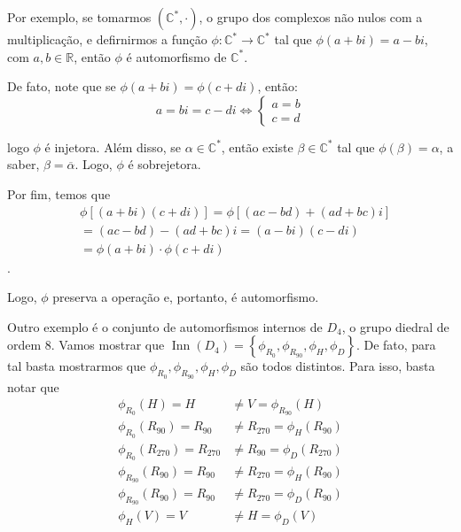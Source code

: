 \documentclass[a4paper,portuguese,11pt,twoside, leqno]{book}
\DeclareMathOperator{\inn}{Inn}
\theoremstyle{definition}
\begin{document}
	\par\vspace{0.3cm} Por exemplo, se tomarmos $(\mathbb{C^{*}}, \cdot)$, o grupo dos complexos não nulos com a multiplicação, e defirnirmos a função $\phi : \mathbb{C^{*}}\to\mathbb{C^{*}}$ tal que $\phi(a+bi) = a-bi$, com $a,b\in\mathbb{R}$, então $\phi$ é automorfismo de $\mathbb{C^{*}}$. 
	\par\vspace{0.3cm} De fato, note que se $\phi(a+bi) = \phi(c+di)$, então:
	\begin{equation*}
	a = bi = c - di \Leftrightarrow \begin{cases}a = b \\ c = d\end{cases}
	\end{equation*}
	\par\vspace{0.3cm} logo $\phi$ é injetora.  Além disso, se $\alpha\in\mathbb{C^{*}}$, então existe $\beta\in\mathbb{C^{*}}$ tal que $\phi(\beta) = \alpha$, a saber, $\beta = \overline{\alpha}$. Logo, $\phi$ é sobrejetora. 
	\par\vspace{0.3cm} Por fim, temos que 
	\begin{align*}
	&\phi[(a + bi)(c + di)] = \phi[(ac - bd) + (ad + bc)i] \\ &= (ac - bd) - (ad + bc)i = (a- bi)(c - di) \\ &= \phi(a + bi)\cdot\phi(c + di)
	\end{align*}.
	\par\vspace{0.3cm} Logo, $\phi$ preserva a operação e, portanto, é automorfismo.
	\par\vspace{0.3cm} Outro exemplo é o conjunto de automorfismos internos de $D_4$, o grupo diedral de ordem $8$. Vamos mostrar que $\inn(D_4) = \displaystyle{ \left\{ \phi_{R_0}, \phi_{R_{90}}, \phi_{H}, \phi_{D} \right\} }$. De fato, para tal basta mostrarmos que $\phi_{R_0}, \phi_{R_{90}}, \phi_{H}, \phi_{D}$ são todos distintos. Para isso, basta notar que
	\begin{align*}
	\phi_{R_{0}}(H) = H &\neq V = \phi_{R_{90}}(H) \\
	\phi_{R_{0}}(R_{90}) = R_{90} &\neq R_{270} = \phi_{H}(R_{90}) \\
	\phi_{R_{0}}(R_{270}) = R_{270} &\neq R_{90} = \phi_{D}(R_{270}) \\
	\phi_{R_{90}}(R_{90}) = R_{90} &\neq R_{270} = \phi_{H}(R_{90}) \\
	\phi_{R_{90}}(R_{90}) = R_{90} &\neq R_{270} = \phi_{D}(R_{90}) \\
	\phi_{H}(V) = V &\neq H = \phi_{D}(V)
	\end{align*}
\end{document}
